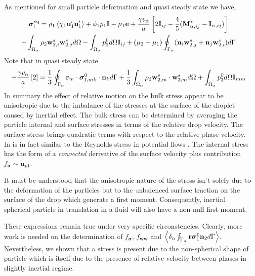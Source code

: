As mentioned for small particle deformation and quasi steady state we have,  
\begin{multline*}
    \bm{\sigma}^\text{eq}_1 = 
    \rho_1\left<\chi_1\textbf{u}_1'\textbf{u}_1'\right> 
    + \phi_1 p_1 \textbf{I} 
    - \mu_1 \textbf{e} 
    + \frac{\gamma v_\alpha }{a} \left[
    2\textbf{I}_{ij} 
    - \frac{4 }{5} (\textbf{M}_{\alpha,ij}^* - \textbf{I}_{\alpha,ij})
    \right]\\
    - \int_{\Omega_{\alpha}} \rho_2 \textbf{w}_{2,i}^s\textbf{w}_{2,j}^s d\Omega
    - \int_{\Omega_{\alpha}} p_2^0 d\Omega \textbf{I}_{ij}
    + (\mu_2 - \mu_1)\oint_{\Gamma_{\alpha}} (\textbf{n}_i \textbf{w}_{2,j}^s + \textbf{n}_j \textbf{w}_{2,i}^s) d\Gamma
\end{multline*} 
Note that in quasi steady state 
\begin{equation*}
    + \frac{\gamma v_\alpha }{a} 
    \left[
    2
    \right]
    = 
    \frac{1}{3}\oint_{\Gamma_{\alpha}} \textbf{r}_m\cdot\bm\sigma_{1,mk}^0\cdot \textbf{n}_k d\Gamma 
    + \frac{1}{3}\int_{\Omega_{\alpha}} \rho_2 \textbf{w}_{2,m}^s\cdot \textbf{w}_{2,m}^s d\Omega
    + \int_{\Omega_{\alpha}} p_2^0 d\Omega \textbf{I}_{mm}
\end{equation*}
In summary the effect of relative motion on the bulk stress appear to be anisotropic due to the imbalance of the stresses at the surface of the droplet caused by inertial effect. 
The bulk stress can be determined by averaging the particle internal and surface stresses in terms of the relative drop velocity. 
The surface stress brings quadratic terms with respect to the relative phase velocity. 
In is in fact similar to the Reynolds stress in potential flows \citet{van1982bubble}. 
The internal stress has the form of a \textit{convected} derivative of the surface velocity plus contribution $f_{\bm\sigma} \sim \textbf{u}_{p 1}$. 

It must be understood that the anisotropic nature of the stress isn't solely due to the deformation of the particles but to the unbalenced surface traction on the surface of the drop which generate a first moment. 
Consequently, inertial spherical particle in translation in a fluid will also have a non-null first moment.  

These expressions remain true under very specific circonstencies.
Clearly, more work is needed on the determination of $f_{\bm\sigma}$, $f_{\textbf{ww}}$ and $\left<\delta_\alpha \oint_{\Gamma_{\alpha}} \textbf r \bm\sigma_1^0 \textbf{n}_2 d\Gamma\right>$.  
Nevertheless, we shown that a stress is present due to the non-spherical shape of particle which is itself due to the presence of relative velocity between phases in slightly inertial regime. 